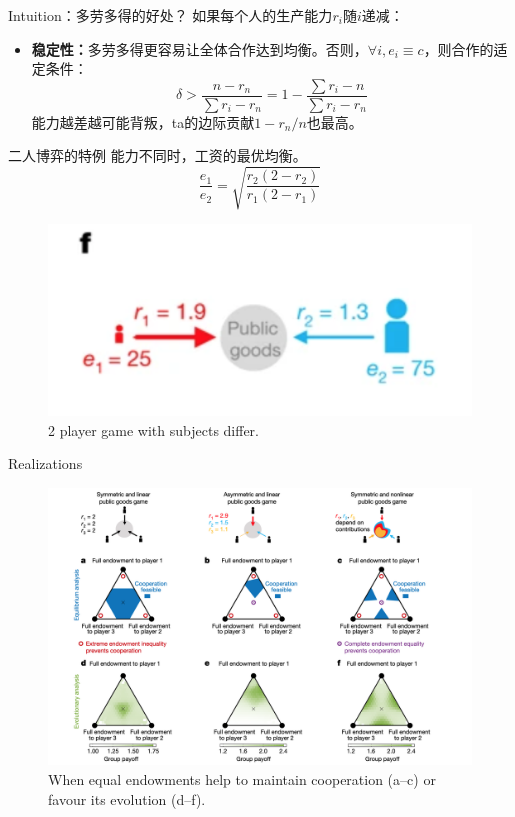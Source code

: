 \documentclass{beamer}
\begin{document}
\begin{frame}{Intuition：多劳多得的好处？}
如果每个人的生产能力$r_i$随$i$递减：
\begin{itemize}
    \item \textbf{稳定性：}多劳多得更容易让全体合作达到均衡。否则，$\forall i, e_i\equiv c$，则合作的适定条件：$$\delta>\frac{n-r_n}{\sum r_i -r_n} = 1 - \frac{\sum r_i -n}{\sum r_i -r_n} $$ 能力越差越可能背叛，ta的边际贡献$1-r_n/n$也最高。

\end{itemize}
\end{frame}
\begin{frame}{二人博弈的特例}
能力不同时，工资的最优均衡。
    \[\frac{{e}_{1}}{{e}_{2}}=\sqrt{\frac{{r}_{2}(2-{r}_{2})}{{r}_{1}(2-{r}_{1})}}\]
    \begin{figure}
        \centering
        \includegraphics[width = 0.5\linewidth]{figs/2player.png}
        \caption{2 player game with subjects differ.}
    \end{figure}
\end{frame}

\begin{frame}{Realizations}
    \begin{figure}
        \centering
        \includegraphics[width = 0.8\linewidth]{figs/realizations.png}
        \caption{When equal endowments help to maintain cooperation (a–c) or favour its evolution (d–f). }
        \label{fig:my_label}
    \end{figure}
\end{frame}
\end{document}
